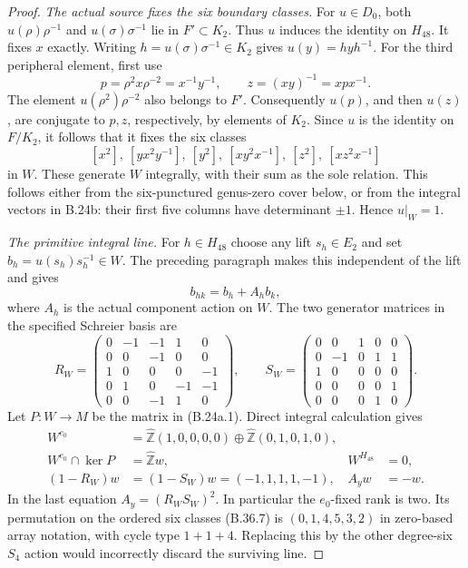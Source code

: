 \begin{proof}
\emph{The actual source fixes the six boundary classes.}
For $u\in D_0$, both $u(\rho)\rho^{-1}$ and
$u(\sigma)\sigma^{-1}$ lie in $F'\subset K_2$.  Thus $u$
induces the identity on $H_{48}$.  It fixes $x$ exactly.
Writing $h=u(\sigma)\sigma^{-1}\in K_2$ gives
$u(y)=hyh^{-1}$.  For the third peripheral element, first use
\[
 p=\rho^2x\rho^{-2}=x^{-1}y^{-1},\qquad
 z=(xy)^{-1}=xpx^{-1}.
\]
The element $u(\rho^2)\rho^{-2}$ also belongs to $F'$.
Consequently $u(p)$, and then $u(z)$, are conjugate to
$p,z$, respectively, by elements of $K_2$.
Since $u$ is the identity on $F/K_2$, it follows that it fixes
the six classes
\[
 [x^2],\ [yx^2y^{-1}],\ [y^2],\ [xy^2x^{-1}],\
 [z^2],\ [xz^2x^{-1}]                                \tag{B.36.7}
\]
in $W$.  These generate $W$ integrally, with their sum as the
sole relation.  This follows either from the six-punctured
genus-zero cover below, or from the integral vectors in B.24b:
their first five columns have determinant $\pm1$.
Hence $u|_W=1$.

\emph{The primitive integral line.}
For $h\in H_{48}$ choose any lift $s_h\in E_2$ and set
$b_h=u(s_h)s_h^{-1}\in W$.  The preceding paragraph makes
this independent of the lift and gives
\[
                  b_{hk}=b_h+A_hb_k,                    \tag{B.36.8}
\]
where $A_h$ is the actual component action on $W$.
The two generator matrices in the specified Schreier basis are
\[
 R_W=\begin{pmatrix}
 0&-1&-1&1&0\\0&0&-1&0&0\\1&0&0&0&-1\\
 0&1&0&-1&-1\\0&0&-1&1&0
 \end{pmatrix},\qquad
 S_W=\begin{pmatrix}
 0&0&1&0&0\\0&-1&0&1&1\\1&0&0&0&0\\
 0&0&0&0&1\\0&0&0&1&0
 \end{pmatrix}.                                         \tag{B.36.9}
\]
Let $P:W\to M$ be the matrix in (B.24a.1).  Direct integral
calculation gives
\[
 \begin{aligned}
 W^{e_0}&=\widehat{\mathbb Z}(1,0,0,0,0)
           \oplus\widehat{\mathbb Z}(0,1,0,1,0),\\
 W^{e_0}\cap\ker P&=\widehat{\mathbb Z}w,
       &W^{H_{48}}&=0,\\
 (1-R_W)w&=(1-S_W)w=(-1,1,1,1,-1),
       &A_yw&=-w.
 \end{aligned}                                         \tag{B.36.10}
\]
In the last equation $A_y=(R_WS_W)^2$.
In particular the $e_0$-fixed rank is two.  Its permutation
on the ordered six classes (B.36.7) is
$(0,1,4,5,3,2)$ in zero-based array notation, with cycle type
$1+1+4$.  Replacing this by the other degree-six $S_4$ action
would incorrectly discard the surviving line.


\end{proof}

